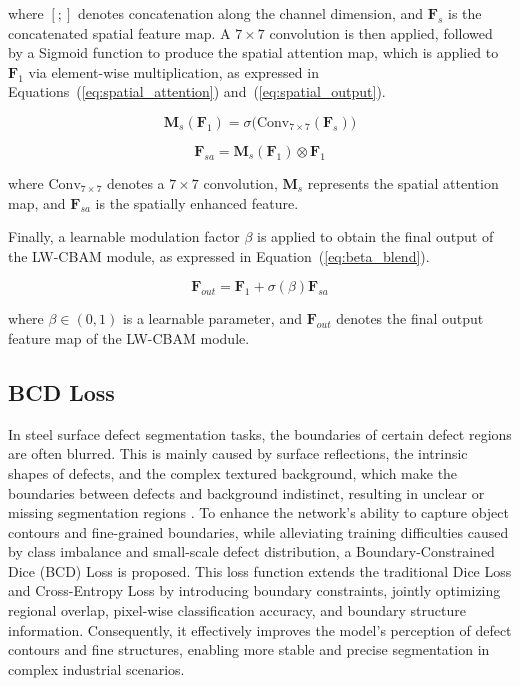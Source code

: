 \documentclass[sn-basic]{sn-jnl}
\theoremstyle{thmstyleone}%
\theoremstyle{thmstyletwo}%
\theoremstyle{thmstylethree}%
\begin{document}
where $[;]$ denotes concatenation along the channel dimension, and $\mathbf{F}_s$ is the concatenated spatial feature map. A $7\times7$ convolution is then applied, followed by a Sigmoid function to produce the spatial attention map, which is applied to $\mathbf{F}_1$ via element-wise multiplication, as expressed in Equations~(\ref{eq:spatial_attention}) and~(\ref{eq:spatial_output}).

\begin{equation}
\mathbf{M}_s(\mathbf{F}_1) = \sigma\big(\text{Conv}_{7\times7}(\mathbf{F}_s)\big)
\label{eq:spatial_attention}
\end{equation}

\begin{equation}
\mathbf{F}_{sa} = \mathbf{M}_s(\mathbf{F}_1) \otimes \mathbf{F}_1
\label{eq:spatial_output}
\end{equation}

where $\text{Conv}_{7\times7}$ denotes a $7\times7$ convolution, $\mathbf{M}_s$ represents the spatial attention map, and $\mathbf{F}_{sa}$ is the spatially enhanced feature.  

Finally, a learnable modulation factor $\beta$ is applied to obtain the final output of the LW-CBAM module, as expressed in Equation~(\ref{eq:beta_blend}).

\begin{equation}
\mathbf{F}_{out} = \mathbf{F}_1 + \sigma(\beta) \mathbf{F}_{sa}
\label{eq:beta_blend}
\end{equation}

where $\beta \in (0,1)$ is a learnable parameter, and $\mathbf{F}_{out}$ denotes the final output feature map of the LW-CBAM module.


\subsection{BCD Loss}
In steel surface defect segmentation tasks, the boundaries of certain defect regions are often blurred. This is mainly caused by surface reflections, the intrinsic shapes of defects, and the complex textured background, which make the boundaries between defects and background indistinct, resulting in unclear or missing segmentation regions \cite{Yang2025Steel}. To enhance the network's ability to capture object contours and fine-grained boundaries, while alleviating training difficulties caused by class imbalance and small-scale defect distribution, a Boundary-Constrained Dice (BCD) Loss is proposed. This loss function extends the traditional Dice Loss and Cross-Entropy Loss by introducing boundary constraints, jointly optimizing regional overlap, pixel-wise classification accuracy, and boundary structure information. Consequently, it effectively improves the model's perception of defect contours and fine structures, enabling more stable and precise segmentation in complex industrial scenarios.  
\end{document}

